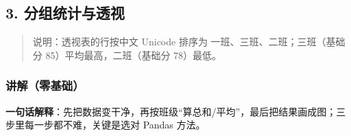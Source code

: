 \subsection{3.
分组统计与透视}\label{ux5206ux7ec4ux7edfux8ba1ux4e0eux900fux89c6}

\begin{Shaded}
\begin{Highlighting}[]
\NormalTok{)[}\NormalTok{].mean().}\NormalTok{(}\NormalTok{))}

\OperatorTok{=}\OperatorTok{=}\OperatorTok{=}\OperatorTok{=}\OperatorTok{=}\NormalTok{(}\NormalTok{)}
\end{Highlighting}
\end{Shaded}

\begin{Shaded}
\begin{Highlighting}[]
\end{Highlighting}
\end{Shaded}

\begin{quote}
说明：透视表的行按中文 Unicode 排序为 一班、三班、二班；三班（基础分
85）平均最高，二班（基础分 78）最低。
\end{quote}

\subsubsection{讲解（零基础）}\label{ux8bb2ux89e3ux96f6ux57faux7840}

\textbf{一句话解释}：先把数据变干净，再按班级``算总和/平均''，最后把结果画成图；三步里每一步都不难，关键是选对
Pandas 方法。

